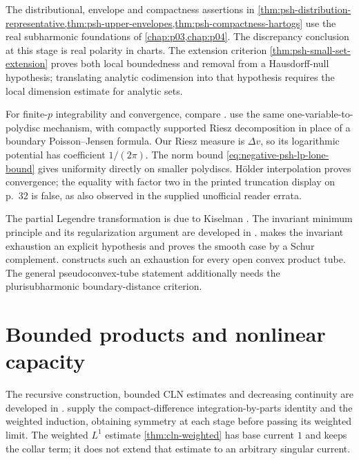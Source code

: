 The distributional, envelope and compactness assertions in \cref{thm:psh-distribution-representative,thm:psh-upper-envelopes,thm:psh-compactness-hartogs} use the real subharmonic foundations of \cref{chap:p03,chap:p04}. The discrepancy conclusion at this stage is real polarity in charts. The extension criterion \cref{thm:psh-small-set-extension} proves both local boundedness and removal from a Hausdorff-null hypothesis; translating analytic codimension into that hypothesis requires the local dimension estimate for analytic sets.

For finite-$p$ integrability and convergence, compare \cite[Theorem 1.48, parts 1--2 and proof Steps 1--2, pp.~30--32]{GZ17}.  use the same one-variable-to-polydisc mechanism, with compactly supported Riesz decomposition in place of a boundary Poisson--Jensen formula. Our Riesz measure is $\Delta v$, so its logarithmic potential has coefficient $1/(2\pi)$. The norm bound \eqref{eq:negative-psh-lp-lone-bound} gives uniformity directly on smaller polydiscs. H\"older interpolation proves convergence; the equality with factor two in the printed truncation display on p.~32 is false, as also observed in the supplied unofficial reader errata.

The partial Legendre transformation is due to Kiselman \cite{Kis78}. The invariant minimum principle and its regularization argument are developed in \cite[Chapter I, Section 7.B, Theorem (7.5) and its proof, p.~57]{DemBook}.  makes the invariant exhaustion an explicit hypothesis and proves the smooth case by a Schur complement.  constructs such an exhaustion for every open convex product tube. The general pseudoconvex-tube statement additionally needs the plurisubharmonic boundary-distance criterion.


\section{Bounded products and nonlinear capacity}
\label{sec:history-bounded-products}
The recursive construction, bounded CLN estimates and decreasing continuity are developed in \cite[Chapter III, Section 3, (3.1)--(3.11), pp.~144--150]{DemBook}.  supply the compact-difference integration-by-parts identity and the weighted induction, obtaining symmetry at each stage before passing its weighted limit. The weighted $L^1$ estimate \cref{thm:cln-weighted} has base current $1$ and keeps the collar term; it does not extend that estimate to an arbitrary singular current.


